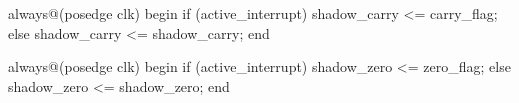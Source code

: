 \begin{vcode}
always@(posedge clk)
begin
    if (active_interrupt)
        shadow_carry <= carry_flag;
    else
        shadow_carry <= shadow_carry;
end

always@(posedge clk)
begin
    if (active_interrupt)
        shadow_zero <= zero_flag;
    else
        shadow_zero <= shadow_zero;
end
\end{vcode}

